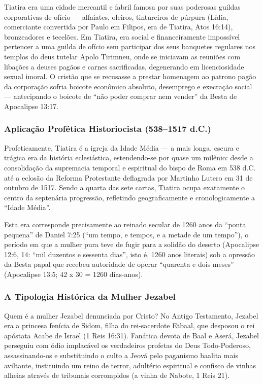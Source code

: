 Tiatira era uma cidade mercantil e fabril famosa por suas poderosas guildas corporativas de ofício — alfaiates, oleiros, tintureiros de púrpura (Lídia, comerciante convertida por Paulo em Filipos, era de Tiatira, Atos 16:14), bronzeadores e tecelões. Em Tiatira, era social e financeiramente impossível pertencer a uma guilda de ofício sem participar dos seus banquetes regulares nos templos do deus tutelar Apolo Tirimneu, onde se iniciavam as reuniões com libações a deuses pagãos e carnes sacrificadas, degenerando em licenciosidade sexual imoral. O cristão que se recusasse a prestar homenagem ao patrono pagão da corporação sofria boicote econômico absoluto, desemprego e execração social — antecipando o boicote de ``não poder comprar nem vender'' da Besta de Apocalipse 13:17.


\subsubsection*{Aplicação Profética Historiocista (538–1517 d.C.)}
Profeticamente, Tiatira é a igreja da Idade Média — a mais longa, escura e trágica era da história eclesiástica, estendendo-se por quase um milênio: desde a consolidação da supremacia temporal e espiritual do bispo de Roma em 538 d.C. até a eclosão da Reforma Protestante deflagrada por Martinho Lutero em 31 de outubro de 1517. Sendo a quarta das sete cartas, Tiatira ocupa exatamente o centro da septenária progressão, refletindo geograficamente e cronologicamente a ``Idade Média''.

Esta era corresponde precisamente ao reinado secular de 1260 anos da ``ponta pequena'' de Daniel 7:25 (``um tempo, e tempos, e a metade de um tempo''), o período em que a mulher pura teve de fugir para a solidão do deserto (Apocalipse 12:6, 14: ``mil duzentos e sessenta dias'', isto é, 1260 anos literais) sob a opressão da Besta papal que recebeu autoridade de operar ``quarenta e dois meses'' (Apocalipse 13:5; 42 x 30 = 1260 dias-anos).


\subsubsection*{A Tipologia Histórica da Mulher Jezabel}
Quem é a mulher Jezabel denunciada por Cristo? No Antigo Testamento, Jezabel era a princesa fenícia de Sidom, filha do rei-sacerdote Etbaal, que desposou o rei apóstata Acabe de Israel (1 Reis 16:31). Fanática devota de Baal e Aserá, Jezabel perseguiu com ódio implacável os verdadeiros profetas do Deus Todo-Poderoso, assassinando-os e substituindo o culto a Jeová pelo paganismo baalita mais aviltante, instituindo um reino de terror, adultério espiritual e confisco de vinhas alheias através de tribunais corrompidos (a vinha de Nabote, 1 Reis 21).


